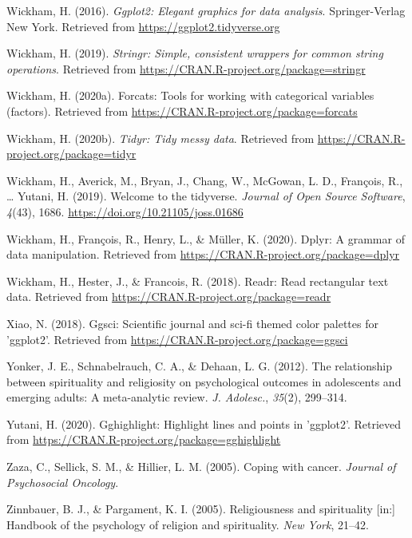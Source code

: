 \documentclass[
  english,
  man,floatsintext]{apa6}
\begin{document}
\leavevmode\hypertarget{ref-R-ggplot2}{}%
Wickham, H. (2016). \emph{Ggplot2: Elegant graphics for data analysis}. Springer-Verlag New York. Retrieved from \url{https://ggplot2.tidyverse.org}

\leavevmode\hypertarget{ref-R-stringr}{}%
Wickham, H. (2019). \emph{Stringr: Simple, consistent wrappers for common string operations}. Retrieved from \url{https://CRAN.R-project.org/package=stringr}

\leavevmode\hypertarget{ref-R-forcats}{}%
Wickham, H. (2020a). Forcats: Tools for working with categorical variables (factors). Retrieved from \url{https://CRAN.R-project.org/package=forcats}

\leavevmode\hypertarget{ref-R-tidyr}{}%
Wickham, H. (2020b). \emph{Tidyr: Tidy messy data}. Retrieved from \url{https://CRAN.R-project.org/package=tidyr}

\leavevmode\hypertarget{ref-R-tidyverse}{}%
Wickham, H., Averick, M., Bryan, J., Chang, W., McGowan, L. D., François, R., \ldots{} Yutani, H. (2019). Welcome to the tidyverse. \emph{Journal of Open Source Software}, \emph{4}(43), 1686. \url{https://doi.org/10.21105/joss.01686}

\leavevmode\hypertarget{ref-R-dplyr}{}%
Wickham, H., François, R., Henry, L., \& Müller, K. (2020). Dplyr: A grammar of data manipulation. Retrieved from \url{https://CRAN.R-project.org/package=dplyr}

\leavevmode\hypertarget{ref-R-readr}{}%
Wickham, H., Hester, J., \& Francois, R. (2018). Readr: Read rectangular text data. Retrieved from \url{https://CRAN.R-project.org/package=readr}

\leavevmode\hypertarget{ref-R-ggsci}{}%
Xiao, N. (2018). Ggsci: Scientific journal and sci-fi themed color palettes for 'ggplot2'. Retrieved from \url{https://CRAN.R-project.org/package=ggsci}

\leavevmode\hypertarget{ref-Yonker2012-zg}{}%
Yonker, J. E., Schnabelrauch, C. A., \& Dehaan, L. G. (2012). The relationship between spirituality and religiosity on psychological outcomes in adolescents and emerging adults: A meta-analytic review. \emph{J. Adolesc.}, \emph{35}(2), 299--314.

\leavevmode\hypertarget{ref-R-gghighlight}{}%
Yutani, H. (2020). Gghighlight: Highlight lines and points in 'ggplot2'. Retrieved from \url{https://CRAN.R-project.org/package=gghighlight}

\leavevmode\hypertarget{ref-Zaza2005-ac}{}%
Zaza, C., Sellick, S. M., \& Hillier, L. M. (2005). Coping with cancer. \emph{Journal of Psychosocial Oncology}.

\leavevmode\hypertarget{ref-Zinnbauer2005-vz}{}%
Zinnbauer, B. J., \& Pargament, K. I. (2005). Religiousness and spirituality {[}in:{]} Handbook of the psychology of religion and spirituality. \emph{New York}, 21--42.

\endgroup
\end{document}
